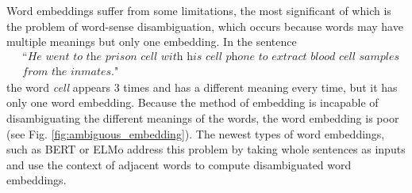         Word \glspl{embedding} suffer from some limitations, the most significant of which is the problem of word-sense disambiguation, which occurs because words may have multiple meanings but only one \gls{embedding}. In the sentence
        \begin{align*}
            &\textit{``He went to the prison cell with his cell phone to extract blood cell samples}\\
            & \textit{from the inmates."}
        \end{align*}
        the word \textit{cell} appears 3 times and has a different meaning every time, but it has only one word \gls{embedding}. Because the method of \gls{embedding} is incapable of disambiguating the different meanings of the words, the word \gls{embedding} is poor (see Fig. \ref{fig:ambiguous_embedding}).
        The newest types of word \glspl{embedding}, such as BERT\cite{devlin2018bert} or ELMo\cite{peters2018elmo} address this problem by taking whole sentences as inputs and use the context of adjacent words to compute disambiguated word \glspl{embedding}.
